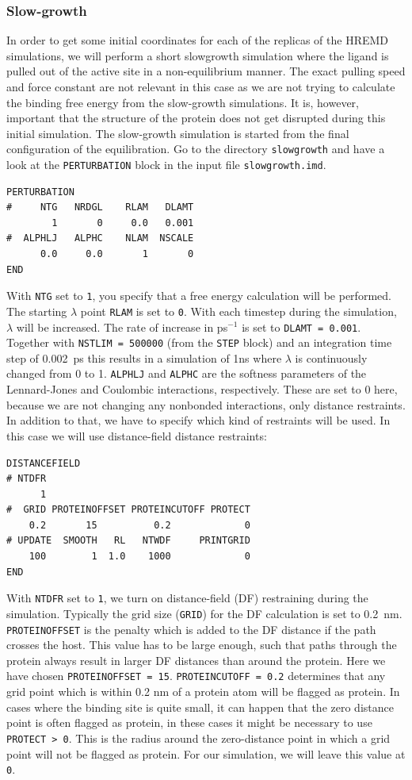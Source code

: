 \subsubsection{Slow-growth}
In order to get some initial coordinates for each of the replicas of the HREMD simulations, we will perform a short slowgrowth simulation where the ligand is pulled out of the active site in a non-equilibrium manner. 
The exact pulling speed and force constant are not relevant in this case as we are not trying to calculate the binding free energy from the slow-growth simulations. 
It is, however, important that the structure of the protein does not get disrupted during this initial simulation. 
The slow-growth simulation is started from the final configuration of the equilibration. 
Go to the directory \texttt{slowgrowth} and have a look at the \texttt{PERTURBATION} block in the input file \texttt{slowgrowth.imd}. 
\begin{lstlisting}
PERTURBATION
#     NTG   NRDGL    RLAM   DLAMT
        1       0     0.0   0.001
#  ALPHLJ   ALPHC    NLAM  NSCALE
      0.0     0.0       1       0
END
\end{lstlisting}
With \texttt{NTG} set to \texttt{1}, you specify that a free energy calculation will be performed. 
The starting $\lambda$ point \texttt{RLAM} is set to \texttt{0}. With each timestep during the simulation, $\lambda$ will be increased. The rate of increase in ps$^{-1}$ is set to \texttt{DLAMT = 0.001}. 
Together with \texttt{NSTLIM = 500000} (from the \texttt{STEP} block) and an integration time step of 0.002~ps this results in a simulation of 1ns where $\lambda$ is continuously changed from 0 to 1. 
\texttt{ALPHLJ} and \texttt{ALPHC} are the softness parameters of the Lennard-Jones and Coulombic interactions, respectively. 
These are set to 0 here, because we are not changing any nonbonded interactions, only distance restraints. 
In addition to that, we have to specify which kind of restraints will be used. In this case we will use distance-field distance restraints:
\begin{lstlisting}
DISTANCEFIELD
# NTDFR
      1
#  GRID PROTEINOFFSET PROTEINCUTOFF PROTECT
    0.2       15          0.2             0
# UPDATE  SMOOTH   RL   NTWDF     PRINTGRID
    100        1  1.0    1000             0
END
\end{lstlisting}
With \texttt{NTDFR} set to \texttt{1}, we turn on distance-field (DF) restraining during the simulation. Typically the grid size (\texttt{GRID}) for the DF calculation is set to 0.2~nm. 
\texttt{PROTEINOFFSET} is the penalty which is added to the DF distance if the path crosses the host. 
This value has to be large enough, such that paths through the protein always result in larger DF distances than around the protein. Here we have chosen \texttt{PROTEINOFFSET = 15}. 
\texttt{PROTEINCUTOFF = 0.2} determines that any grid point which is within 0.2 nm of a protein atom will be flagged as protein. 
In cases where the binding site is quite small, it can happen that the zero distance point is often flagged as protein, in these cases it might be necessary to use \texttt{PROTECT > 0}. 
This is the radius around the zero-distance point in which a grid point will not be flagged as protein. For our simulation, we will leave this value at \texttt{0}. 


